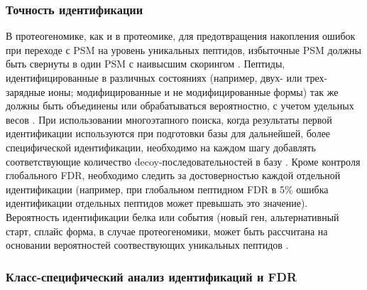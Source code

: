 \subsubsection{Точность идентификации}
В протеогеномике, как и в протеомике, для предотвращения накопления ошибок при переходе с PSM на уровень уникальных пептидов, избыточные PSM должны быть свернуты в один PSM с наивысшим скорингом \cite{nesvizhskii2010survey}. Пептиды, идентифицированные в различных состояниях (например, двух- или трех-зарядные ионы; модифицированные и не модифицированные формы) так же должны быть объединены или обрабатываться вероятностно, с учетом удельных весов \cite{shteynberg2011iprophet}. При использовании многоэтапного поиска, когда результаты первой идентификации используются при подготовки базы для дальнейшей, более специфической идентификации, необходимо на каждом шагу добавлять соответствующие количество decoy-последовательностей в базу \cite{nesvizhskii2010survey}. Кроме контроля глобального FDR, необходимо следить за достоверностью каждой отдельной идентификации (например, при глобальном пептидном FDR в 5\% ошибка идентификации отдельных пептидов может превышать это значение). Вероятность идентификации белка или события (новый ген, альтернативный старт, сплайс форма, в случае протеогеномики, может быть рассчитана на основании вероятностей соотвествующих уникальных пептидов \cite{shteynberg2011iprophet, castellana2010proteogenomics}.

\subsubsection{Класс-специфический анализ идентификаций и FDR}


